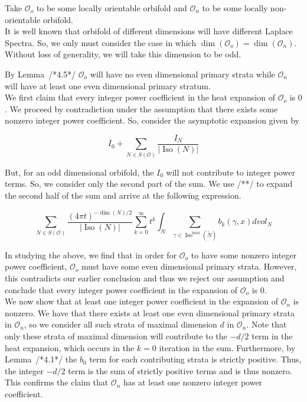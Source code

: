 \documentclass{amsart}
\theoremstyle{plain}
\theoremstyle{definition}
\theoremstyle{remark}
\newcommand{\myabs}[1]{\vert#1\vert}
\newcommand{\orb}{\mathcal O}
\DeclareMathOperator{\iso}{Iso}
\begin{document}
Take $\orb_o$ to be some locally orientable orbifold and $\orb_n$ to be
some locally non-orientable orbifold.\\

It is well known that orbifold of different dimensions will have different
Laplace Spectra. So, we only must consider the case in which $\dim(\orb_o)
= \dim(\orb_n)$. Without loss of generality, we will take this dimension to
be odd. 


By Lemma~/*4.5*/ $\orb_o$ will have no even dimensional primary strata while
$\orb_n$ will have at least one even dimensional primary stratum.\\

We first claim that every integer power coefficient in the heat expansion
of $\orb_o$ is $0$. We proceed by contradiction under the assumption that
there exists some nonzero integer power coefficient. So, consider the asymptotic expansion given by

\begin{equation*}
    I_0 + \sum_{N \in S(\orb)} \frac{I_N}{\myabs{\iso(N)}}
\end{equation*}

But, for an odd dimensional orbifold, the $I_0$ will not contribute to
integer power terms. So, we consider only the second part of the sum. We
use /**/ to expand the second half of the sum and arrive at the following
expression.

\begin{equation*}
    \sum_{N \in S(\mathcal{O})}\frac{{(4\pi
    t)}^{-\dim(N)/2}}{\myabs{\iso(N)}}\sum_{k=0}^{\infty}t^k\int_{N}
    \sum_{\gamma \in \iso^{\max}(\widetilde{N})}b_k(\gamma,x) dvol_N
\end{equation*}

In studying the above, we find that in order for $\orb_o$ to have some
nonzero integer power coefficient, $\orb_o$ must have some even dimensional
primary strata. However, this contradicts our earlier conclusion and thus
we reject our assumption and conclude that every integer power coefficient
in the expansion of $\orb_o$ is $0$.\\

We now show that at least one integer power coefficient in the expansion of
$\orb_n$ is nonzero. We have that there exists at least one even
dimensional primary strata in $\orb_n$, so we consider all such strata of
maximal dimension $d$ in $\orb_n$. Note that only these strata of maximal
dimension will contribute to the $-d/2$ term in the heat expansion, which
occurs in the $k=0$ iteration in the sum. Furthermore, by Lemma~/*4.1*/ the
$b_0$ term for each contributing strata is strictly positive. Thus, the
integer $-d/2$ term is the sum of strictly positive terms and is thus
nonzero. This confirms the claim that $\orb_n$ has at least one nonzero
integer power coefficient.\\
\end{document}

